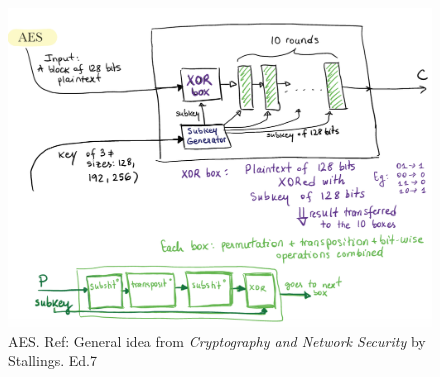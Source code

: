 \begin{figure}[h!]
  \includegraphics[width=\linewidth]{aes.jpg}
  \caption{AES. Ref: General idea from \textit{Cryptography and Network Security} by Stallings. Ed.7}
  \label{fig:aes}
\end{figure}

